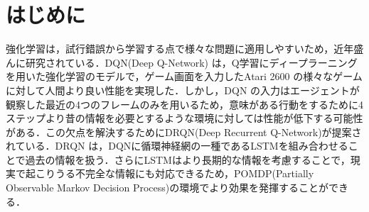 \documentclass{eithesis}
\begin{document}
\etTitleEn{}    %
\etMakeTitle
{}
\pagestyle{fancyplain}
\lhead{\leftmark}  %
\chead{}           %
\rhead{\rightmark} %
\lfoot{}           %
\cfoot{\thepage}   %
\rfoot{}           %

\chapter{はじめに}
  強化学習は，試行錯誤から学習する点で様々な問題に適用しやすいため，近年盛んに研究されている．DQN(Deep Q-Network) は，Q学習にディープラーニングを用いた強化学習のモデルで，ゲーム画面を入力したAtari 2600 の様々なゲームに対して人間より良い性能を実現した．しかし，DQN の入力はエージェントが観察した最近の4つのフレームのみを用いるため，意味がある行動をするために4ステップより昔の情報を必要とするような環境に対しては性能が低下する可能性がある．この欠点を解決するためにDRQN(Deep Recurrent Q-Network)が提案されている．DRQN は，DQNに循環神経網の一種であるLSTMを組み合わせることで過去の情報を扱う．さらにLSTMはより長期的な情報を考慮することで，現実で起こりうる不完全な情報にも対応できるため，POMDP(Partially Observable Markov Decision Process)の環境でより効果を発揮することができる．
\end{document}
